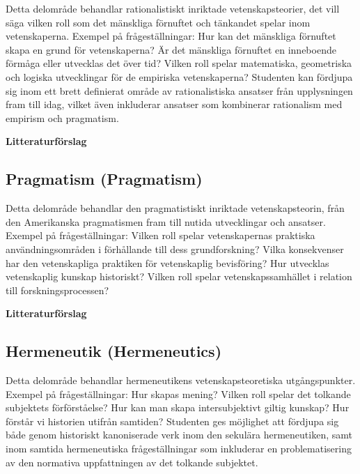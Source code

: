 \documentclass[12pt,a4paper]{article}
\begin{document}
Detta delområde behandlar rationalistiskt inriktade vetenskapsteorier, det vill säga vilken roll som det mänskliga förnuftet och tänkandet spelar inom vetenskaperna. Exempel på frågeställningar: Hur kan det mänskliga förnuftet skapa en grund för vetenskaperna? Är det mänskliga förnuftet en inneboende förmåga eller utvecklas det över tid? Vilken roll spelar matematiska, geometriska och logiska utvecklingar för de empiriska vetenskaperna? Studenten kan fördjupa sig inom ett brett definierat område av rationalistiska ansatser från upplysningen fram till idag, vilket även inkluderar ansatser som kombinerar rationalism med empirism och pragmatism. 

\noindent \textbf{Litteraturförslag}




 

\subsection{Pragmatism (Pragmatism)}
Detta delområde behandlar den pragmatistiskt inriktade vetenskapsteorin, från den Amerikanska pragmatismen fram till nutida utvecklingar och ansatser. Exempel på frågeställningar: Vilken roll spelar vetenskapernas praktiska användningsområden i förhållande till dess grundforskning? Vilka konsekvenser har den vetenskapliga praktiken för vetenskaplig bevisföring? Hur utvecklas vetenskaplig kunskap historiskt? Vilken roll spelar vetenskapssamhället i relation till forskningsprocessen?

\noindent \textbf{Litteraturförslag}

 \fullcite{}
 
 \fullcite{}
  
 \fullcite{}

\subsection{Hermeneutik (Hermeneutics)}
Detta delområde behandlar hermeneutikens vetenskapsteoretiska utgångspunkter. Exempel på frågeställningar: Hur skapas mening? Vilken roll spelar det tolkande subjektets förförståelse? Hur kan man skapa intersubjektivt giltig kunskap? Hur förstår vi historien utifrån samtiden? Studenten ges möjlighet att fördjupa sig både genom historiskt kanoniserade verk inom den sekulära hermeneutiken, samt inom samtida hermeneutiska frågeställningar som inkluderar en problematisering av den normativa uppfattningen av det tolkande subjektet. 
\end{document}
